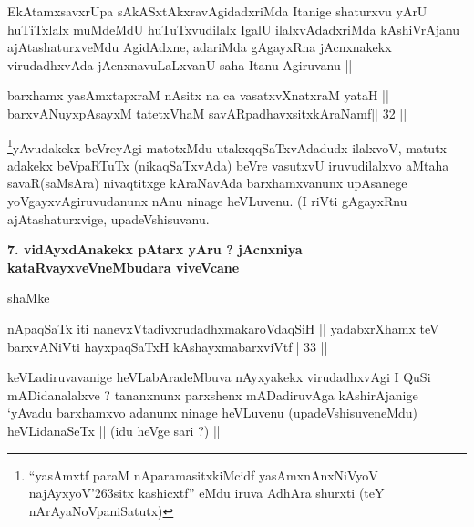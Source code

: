 \begin{artha}
EkAtamxsavxrUpa sAkASxtAkxravAgidadxriMda Itanige shaturxvu yArU huTiTxlalx muMdeMdU huTuTxvudilalx IgalU ilalxvAdadxriMda kAshiVrAjanu ajAtashaturxveMdu AgidAdxne, adariMda gAgayxRna jAcnxnakekx virudadhxvAda jAcnxnavuLaLxvanU saha Itanu Agiruvanu ||
\end{artha}

\begin{shl}
barxhamx yasAmxtapxraM nAsitx na ca vasatxvXnatxraM yataH ||
barxvANuyxpAsayxM tatetxV\s haM savARpadhavxsitxkAraNamf\hfill || 32 ||
\end{shl}

\begin{artha}
\footnote[3]{``yasAmxtf paraM nAparamasitxkiMcidf yasAmxnAnxNiVyoV 
najAyxyoV\char'263sitx kashicxtf'' eMdu iruva AdhAra shurxti (teY| 
nArAyaNoVpaniSatutx)}yAvudakekx beVreyAgi matotxMdu utakxqqSaTxvAdadudx ilalxvoV, matutx adakekx beVpaRTuTx (nikaqSaTxvAda) beVre vasutxvU iruvudilalxvo aMtaha savaR(saMsAra) nivaqtitxge kAraNavAda barxhamxvanunx upAsanege yoVgayxvAgiruvudanunx nAnu ninage heVLuvenu. (I riVti gAgayxRnu ajAtashaturxvige, upadeVshisuvanu.
\end{artha}

\begin{artha}
{\bf 7. vidAyxdAnakekx pAtarx yAru ? jAcnxniya kataRvayxveVneMbudara 
viveVcane}
\end{artha}

\begin{artha}
shaMke 
\end{artha}

\begin{shl}
\footnotemark[4]nApaqSaTx iti nanevxVtadivxrudadhxmakaroVdaqSiH ||
yadabxrXhamx teV barxvANiVti hayxpaqSaTxH kAshayxmabarxviVtf\hfill || 33 ||
\end{shl}

\begin{artha}
keVLadiruvavanige heVLabAradeMbuva nAyxyakekx virudadhxvAgi I QuSi mADidanalalxve ? tananxnunx parxshenx mADadiruvAga kAshirAjanige `yAvadu barxhamxvo adanunx ninage heVLuvenu (upadeVshisuveneMdu) heVLidanaSeTx || (idu heVge sari ?) ||
\end{artha}

